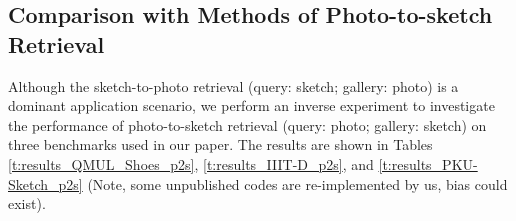 \documentclass[journal]{IEEEtran}
\begin{document}
\subsection{Comparison with Methods of Photo-to-sketch Retrieval}

Although the sketch-to-photo retrieval (query: sketch; gallery: photo) is a dominant application scenario, we perform an inverse experiment to investigate the performance of photo-to-sketch retrieval (query: photo; gallery: sketch) on three benchmarks used in our paper. The results are shown in Tables \ref{t:results_QMUL_Shoes_p2s}, \ref{t:results_IIIT-D_p2s}, and \ref{t:results_PKU-Sketch_p2s} (Note, some unpublished codes are re-implemented by us, bias could exist). 

\tabcolsep=4pt
\begin{table}[!ht]
\centering
{}
\caption{The performance of photo-to-sketch retrieval on the QMUL-Shoes dataset.}
\label{t:results_QMUL_Shoes_p2s}
\end{table}


\tabcolsep=4pt
\begin{table}[!ht]
\centering
{}
\caption{The performance of photo-to-sketch retrieval on the IIIT-D Viewed Sketch dataset.}
\label{t:results_IIIT-D_p2s}
\end{table}
\end{document}
